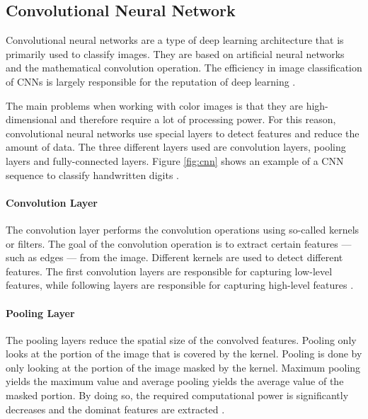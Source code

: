 \subsection{Convolutional Neural Network}
\label{subsec:cnn}

Convolutional neural networks are a type of deep learning architecture that is primarily used to classify images.
They are based on artificial neural networks and the mathematical convolution operation.
The efficiency in image classification of CNNs is largely responsible for the reputation of deep learning \cite{cnn_pathmind}.

The main problems when working with color images is that they are high-dimensional and therefore require a lot of processing power.
For this reason, convolutional neural networks use special layers to detect features and reduce the amount of data.
The three different layers used are convolution layers, pooling layers and fully-connected layers.
Figure \ref{fig:cnn} shows an example of a CNN sequence to classify handwritten digits \cite{cnn_pathmind}.

\paragraph{Convolution Layer}
The convolution layer performs the convolution operations using so-called kernels or filters.
The goal of the convolution operation is to extract certain features --- such as edges --- from the image.
Different kernels are used to detect different features.
The first convolution layers are responsible for capturing low-level features, while following layers are responsible for capturing high-level features \cite{cnn_tds}.
\clearpage

\paragraph{Pooling Layer}
The pooling layers reduce the spatial size of the convolved features.
Pooling only looks at the portion of the image that is covered by the kernel.
Pooling is done by only looking at the portion of the image masked by the kernel.
Maximum pooling yields the maximum value and average pooling yields the average value of the masked portion.
By doing so, the required computational power is significantly decreases and the dominat features are extracted \cite{cnn_tds}.
\\

